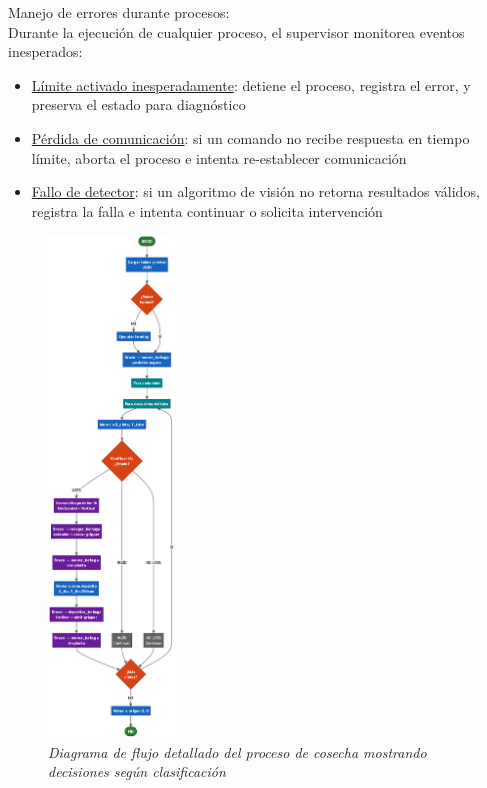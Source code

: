 Manejo de errores durante procesos:\\
Durante la ejecución de cualquier proceso, el supervisor monitorea eventos inesperados:

\begin{itemize}[label=$\bullet$]
    \item \underline{Límite activado inesperadamente}: detiene el proceso, registra el error, y preserva el estado para diagnóstico
    \item \underline{Pérdida de comunicación}: si un comando no recibe respuesta en tiempo límite, aborta el proceso e intenta re-establecer comunicación
    \item \underline{Fallo de detector}: si un algoritmo de visión no retorna resultados válidos, registra la falla e intenta continuar o solicita intervención
\end{itemize}

\begin{figure}[H]
    \centering
    \includegraphics[width=0.3\textwidth]{imagenes/diagrama_flujo_cosecha.png}
    \caption{\textit{Diagrama de flujo detallado del proceso de cosecha mostrando decisiones según clasificación}}
    \label{fig:flujo_cosecha}
\end{figure}
